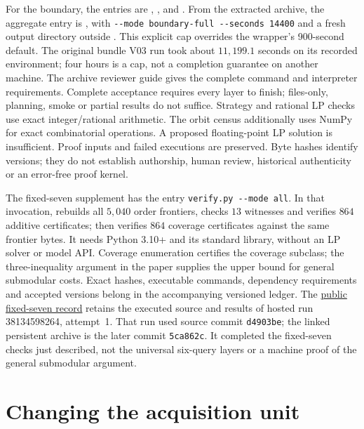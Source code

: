 \documentclass[pdflatex,sn-mathphys-num]{sn-jnl}
\theoremstyle{thmstyleone}
\theoremstyle{thmstylethree}
\theoremstyle{thmstyletwo}
\begin{document}
For the boundary, the entries are , ,  and . From the extracted archive, the aggregate entry is , with \verb|--mode boundary-full --seconds 14400| and a fresh output directory outside . This explicit cap overrides the wrapper's 900-second default. The original bundle V03 run took about $11,199.1$ seconds on its recorded environment; four hours is a cap, not a completion guarantee on another machine. The archive reviewer guide gives the complete command and interpreter requirements. Complete acceptance requires every layer to finish; files-only, planning, smoke or partial results do not suffice. Strategy and rational LP checks use exact integer/rational arithmetic. The orbit census additionally uses NumPy for exact combinatorial operations. A proposed floating-point LP solution is insufficient. Proof inputs and failed executions are preserved. Byte hashes identify versions; they do not establish authorship, human review, historical authenticity or an error-free proof kernel.

The fixed-seven supplement has the entry \verb|verify.py --mode all|. In that invocation,  rebuilds all $5,040$ order frontiers, checks $13$ witnesses and verifies $864$ additive certificates;  then verifies $864$ coverage certificates against the same frontier bytes. It needs Python 3.10+ and its standard library, without an LP solver or model API. Coverage enumeration certifies the coverage subclass; the three-inequality argument in the paper supplies the upper bound for general submodular costs. Exact hashes, executable commands, dependency requirements and accepted versions belong in the accompanying versioned ledger. The \href{https://github.com/SHiJiE1115/newproj/blob/5ca862c87d35df3db12c83e28e5167f4eebdbb09/theory/HOSTED_RUNS.md}{public fixed-seven record} retains the executed source and results of hosted run 38134598264, attempt~1. That run used source commit \texttt{d4903be}; the linked persistent archive is the later commit \texttt{5ca862c}. It completed the fixed-seven checks just described, not the universal six-query layers or a machine proof of the general submodular argument.


\section{Changing the acquisition unit}\label{app:record-acquisition}
\end{document}
